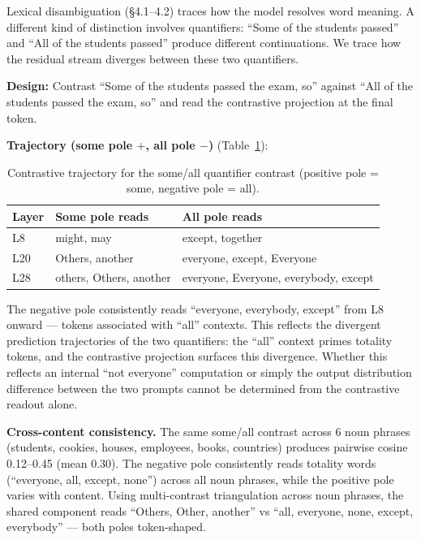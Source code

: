 \documentclass[11pt]{article}
\begin{document}
Lexical disambiguation (\S4.1--4.2) traces how the model resolves word meaning.
A different kind of distinction involves quantifiers: ``Some of the students
passed'' and ``All of the students passed'' produce different continuations.
We trace how the residual stream diverges between these two quantifiers.

\textbf{Design:} Contrast ``Some of the students passed the exam, so'' against
``All of the students passed the exam, so'' and read the contrastive projection
at the final token.

\textbf{Trajectory (some pole $+$, all pole $-$)} (Table~\ref{tab:somall-traj}):

\begin{table}[htbp]
\centering
\small
\begin{tabular}{lll}
\toprule
Layer & Some pole reads & All pole reads \\
\midrule
L8 & might, may & except, together \\
L20 & Others, another & everyone, except, Everyone \\
L28 & others, Others, another & everyone, Everyone, everybody, except \\
\bottomrule
\end{tabular}
\caption{Contrastive trajectory for the some/all quantifier contrast (positive pole = some, negative pole = all).}
\label{tab:somall-traj}
\end{table}

The negative pole consistently reads ``everyone, everybody, except'' from L8
onward --- tokens associated with ``all'' contexts. This reflects the divergent
prediction trajectories of the two quantifiers: the ``all'' context primes
totality tokens, and the contrastive projection surfaces this divergence.
Whether this reflects an internal ``not everyone'' computation or simply the
output distribution difference between the two prompts cannot be determined
from the contrastive readout alone.

\textbf{Cross-content consistency.} The same some/all contrast across 6 noun
phrases (students, cookies, houses, employees, books, countries) produces
pairwise cosine 0.12--0.45 (mean 0.30). The negative pole consistently reads
totality words (``everyone, all, except, none'') across all noun phrases,
while the positive pole varies with content. Using multi-contrast
triangulation across noun phrases, the shared component reads ``Others,
Other, another'' vs ``all, everyone, none, except, everybody'' --- both poles
token-shaped.
\end{document}
